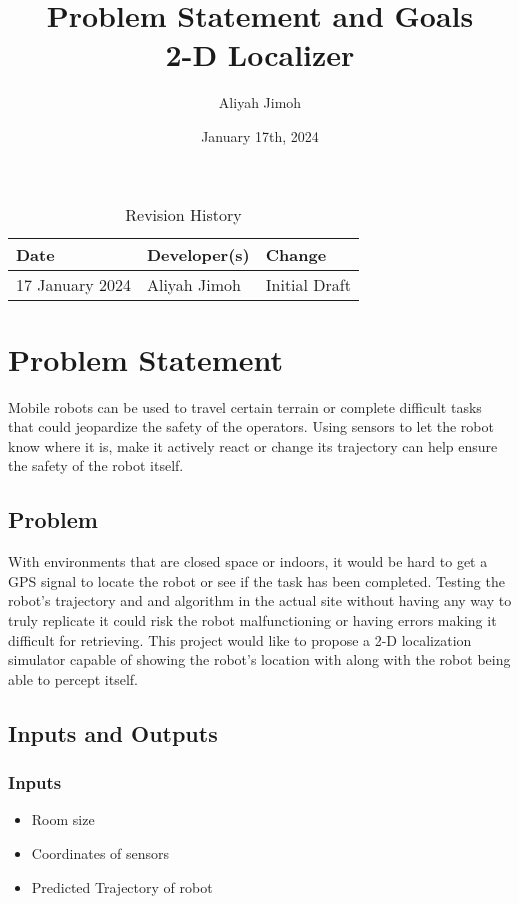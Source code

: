 \documentclass{article}
\title{Problem Statement and Goals\\2-D Localizer}
\author{Aliyah Jimoh}
\date{January 17th, 2024}
\begin{document}
\maketitle

\begin{table}[hp]
\caption{Revision History} \label{TblRevisionHistory}
\begin{tabularx}{\textwidth}{llX}
\toprule
\textbf{Date} & \textbf{Developer(s)} & \textbf{Change}\\
\midrule
17 January 2024 & Aliyah Jimoh & Initial Draft\\

\bottomrule
\end{tabularx}
\end{table}

\section{Problem Statement}
Mobile robots can be used to travel certain terrain or complete difficult tasks that could jeopardize the safety of the operators. Using sensors to let the robot know where it is, make it actively react or change its trajectory can help ensure the safety of the robot itself.
\subsection{Problem}
With environments that are closed space or indoors, it would be hard to get a GPS signal to locate the robot or see if the task has been completed. Testing the robot's trajectory and and algorithm in the actual site without having any way to truly replicate it could risk the robot malfunctioning or having errors making it difficult for retrieving. This project would like to propose a 2-D localization simulator capable of showing the robot's location with along with the robot being able to percept itself.  

\subsection{Inputs and Outputs}

\subsubsection{Inputs}
\begin{itemize}
    \item Room size  
    \item Coordinates of sensors
    \item Predicted Trajectory of robot
\end{itemize}
\end{document}
